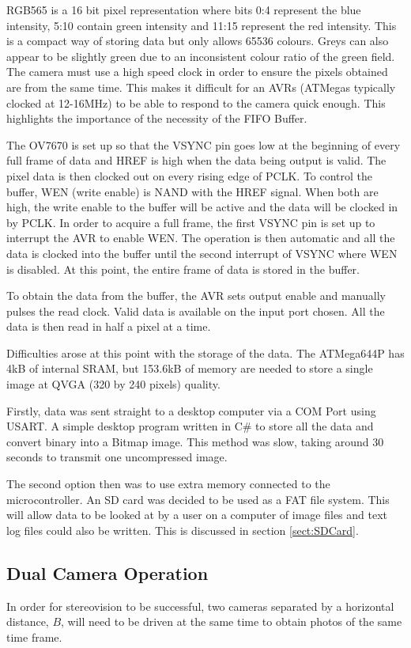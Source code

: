 RGB565 is a 16 bit pixel representation where bits 0:4 represent the blue intensity, 5:10 contain green intensity and 11:15 represent the red intensity. This is a compact way of storing data but only allows 65536 colours. Greys can also appear to be slightly green due to an inconsistent colour ratio of the green field. 
The camera must use a high speed clock in order to ensure the pixels obtained are from the same time. This makes it difficult for an AVRs (ATMegas typically clocked at 12-16MHz) to be able to respond to the camera quick enough. This highlights the importance of the necessity of the FIFO Buffer. 

The OV7670 is set up so that the VSYNC pin goes low at the beginning of every full frame of data and HREF is high when the data being output is valid. The pixel data is then clocked out on every rising edge of PCLK. To control the buffer, WEN (write enable) is NAND with the HREF signal. When both are high, the write enable to the buffer will be active and the data will be clocked in by PCLK. In order to acquire a full frame, the first VSYNC pin is set up to interrupt the AVR to enable WEN. The operation is then automatic and all the data is clocked into the buffer until the second interrupt of VSYNC where WEN is disabled. At this point, the entire frame of data is stored in the buffer.

To obtain the data from the buffer, the AVR sets output enable and manually pulses the read clock. Valid data is available on the input port chosen. All the data is then read in half a pixel at a time. 

Difficulties arose at this point with the storage of the data. The ATMega644P has 4kB of internal SRAM, but  153.6kB of memory are needed to store a single image at QVGA (320 by 240 pixels) quality. 

Firstly, data was sent straight to a desktop computer via a COM Port using USART. A simple desktop program written in C\# to store all the data and convert binary into a Bitmap image. This method was slow, taking around 30 seconds to transmit one uncompressed image. 

The second option then was to use extra memory connected to the microcontroller. An SD card was decided to be used as a FAT file system. This will allow data to be looked at by a user on a computer of image files and text log files could also be written. This is discussed in section \ref{sect:SDCard}. 
\subsection{Dual Camera Operation}
In order for stereovision to be successful, two cameras separated by a horizontal distance, $B$, will need to be driven at the same time to obtain photos of the same time frame. 

